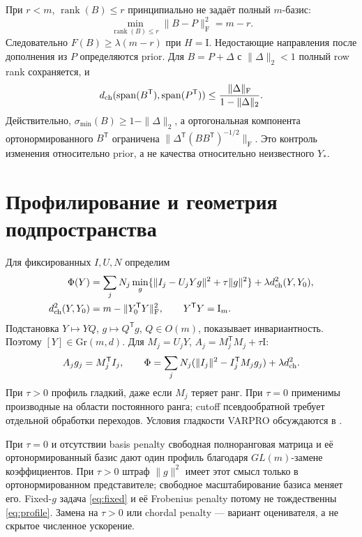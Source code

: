 \documentclass[11pt,a4paper]{article}
\newcommand{\Id}{\mathrm I}
\newcommand{\T}{^{\mathsf T}}
\newcommand{\F}{_{\mathrm F}}
\newcommand{\Gr}{\mathrm{Gr}}
\DeclareMathOperator{\rank}{rank}
\DeclareMathOperator{\spanop}{span}
\begin{document}
При $r<m$, $\rank(B)\le r$ принципиально не задаёт полный $m$-базис:
\begin{equation}\label{eq:rankfloor}
 \min_{\rank(B)\le r}\|B-P\|\F^2=m-r.
\end{equation}
Следовательно $F(B)\ge\lambda(m-r)$ при $H=\Id$.
Недостающие направления после дополнения из $P$ определяются prior.
Для $B=P+\Delta$ с $\|\Delta\|_2<1$ полный row rank сохраняется, и
\begin{equation}\label{eq:projectorbound}
 d_{\rm ch}(\spanop(B\T),\spanop(P\T))
 \le\frac{\|\Delta\|\F}{1-\|\Delta\|_2}.
\end{equation}
Действительно, $\sigma_{\min}(B)\ge1-\|\Delta\|_2$, а ортогональная
компонента ортонормированного $B\T$ ограничена
$\|\Delta\T(BB\T)^{-1/2}\|\F$.
Это контроль изменения относительно prior, а не качества относительно
неизвестного $Y_*$.

\section{Профилирование и геометрия подпространства}\label{sec:grassmann}

Для фиксированных $I,U,N$ определим
\begin{align}
 \Phi(Y)&=\sum_jN_j\min_g\{\|I_j-U_jYg\|^2+\tau\|g\|^2\}
                    +\lambda d_{\rm ch}^2(Y,Y_0),\label{eq:profile}\\
 d_{\rm ch}^2(Y,Y_0)&=m-\|Y_0\T Y\|\F^2,
 \qquad Y\T Y=\Id_m.\nonumber
\end{align}
Подстановка $Y\mapsto YQ$, $g\mapsto Q\T g$, $Q\in O(m)$,
показывает инвариантность. Поэтому $[Y]\in\Gr(m,d)$.
Для $M_j=U_jY$, $A_j=M_j\T M_j+\tau\Id$:
\begin{equation}\label{eq:profileformula}
 A_jg_j=M_j\T I_j,\qquad
 \Phi=\sum_jN_j(\|I_j\|^2-I_j\T M_jg_j)+\lambda d_{\rm ch}^2.
\end{equation}
При $\tau>0$ профиль гладкий, даже если $M_j$ теряет ранг.
При $\tau=0$ применимы производные на области постоянного ранга;
cutoff псевдообратной требует отдельной обработки переходов.
Условия гладкости VARPRO обсуждаются в \cite{varpro}.

При $\tau=0$ и отсутствии basis penalty свободная полноранговая
матрица и её ортонормированный базис дают один профиль благодаря
$GL(m)$-замене коэффициентов. При $\tau>0$ штраф $\|g\|^2$ имеет
этот смысл только в ортонормированном представителе; свободное
масштабирование базиса меняет его. Fixed-$g$ задача \eqref{eq:fixed}
и её Frobenius penalty потому не тождественны \eqref{eq:profile}.
Замена на $\tau>0$ или chordal penalty --- вариант оценивателя,
а не скрытое численное ускорение.
\end{document}

